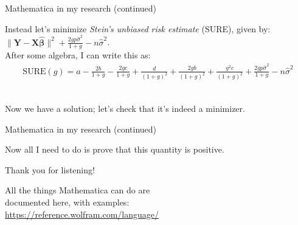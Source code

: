 \documentclass[dvipsnames, handout]{beamer}
\let\b\mathbf
\let\bg\boldsymbol
\newcommand{\1}{\mathds{1}}	%
\begin{document}
\begin{frame}{Mathematica in my research (continued)}
	
{\small Instead let's minimize \textit{Stein's unbiased risk estimate} (SURE), given by:\\[.5em] 
$\|\b Y - \b X\bg{\hat\beta}\|^2 + \frac{2gp\hat\sigma^2}{1+g}-n\hat\sigma^2$.\\[1em]

After some algebra, I can write this as:
{\scriptsize\begin{align*}
\text{SURE}(g)= a-\frac{2b}{1+g}-\frac{2gc}{1+g}+\frac{d}{(1+g)^2}+\frac{2gb}{(1+g)^2}+\frac{g^2c}{(1+g)^2}+\frac{2gp\hat\sigma^2}{1+g}-n\hat\sigma^2
\end{align*}}\\[-1em]
\begin{figure}[H]
\centering{}	
\end{figure}
Now we have a solution; let's check that it's indeed a minimizer.}
\end{frame}

\begin{frame}{Mathematica in my research (continued)}

\begin{figure}[H]
\centering{}	
\end{figure}
Now all I need to do is prove that this quantity is positive.
\end{frame}



\begin{frame}
\begin{center}
{\Large\color{titleText} Thank you for listening!\\[2em]}

All the things Mathematica can do are\\ documented here, with examples:\\ {\color{RoyalBlue}\url{https://reference.wolfram.com/language/}}
\end{center}
\end{frame}

\end{document}
